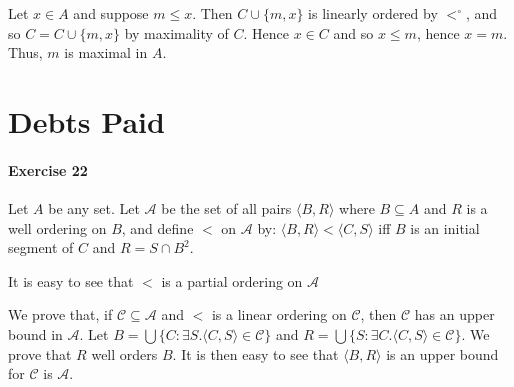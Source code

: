 \documentclass{report}
\begin{document}
    Let $x \in A$ and suppose $m \leq x$. Then $C \cup \{ m, x \}$ is linearly ordered by $<^\circ$,
    and so $C = C \cup \{ m,x \}$ by maximality of $C$. Hence $x \in C$ and so $x \leq m$, hence $x = m$. Thus,
    $m$ is maximal in $A$.

    \section{Debts Paid}

    \paragraph{Exercise 22}
    Let $A$ be any set. Let $\mathcal{A}$ be the set of all pairs $\langle B, R \rangle$ where $B \subseteq A$
    and $R$ is a well ordering on $B$, and define $<$ on $\mathcal{A}$ by:
    $\langle B, R \rangle < \langle C, S \rangle$ iff $B$ is an initial segment of $C$ and $R = S \cap B^2$.

    It is easy to see that $<$ is a partial ordering on $\mathcal{A}$

    We prove that, if $\mathcal{C} \subseteq \mathcal{A}$ and $<$ is a linear ordering on $\mathcal{C}$,
    then $\mathcal{C}$ has an upper bound in $\mathcal{A}$. Let $B = \bigcup \{ C : \exists S. \langle C, S \rangle \in \mathcal{C} \}$
    and $R = \bigcup \{ S : \exists C. \langle C, S \rangle \in \mathcal{C} \}$. We prove that $R$ well orders $B$.
    It is then easy to see that $\langle B, R \rangle$ is an upper bound for $\mathcal{C}$ is $\mathcal{A}$.
\end{document}
